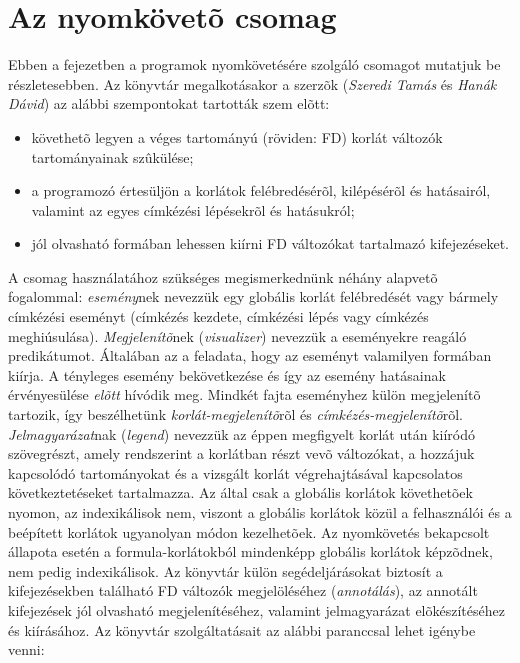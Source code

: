 \clearpage

\section{Az \fdbg nyomkövetõ csomag}

\label{fdbg}
Ebben a fejezetben a \clpfd programok nyomkövetésére szolgáló \fdbg csomagot
mutatjuk be részletesebben. Az \fdbg könyvtár megalkotásakor a szerzõk
(\emph{Szeredi Tamás} és \emph{Hanák Dávid}) az alábbi szempontokat tartották
szem elõtt:

\begin{itemize}
\item követhetõ legyen a véges tartományú (röviden: FD) korlát változók
  tartományainak szûkülése;
\item a programozó értesüljön a korlátok felébredésérõl, kilépésérõl és
  hatásairól, valamint az egyes címkézési lépésekrõl és hatásukról;
\item jól olvasható formában lehessen kiírni FD változókat tartalmazó
  kifejezéseket.
\end{itemize}

A csomag használatához szükséges megismerkednünk néhány alapvetõ fogalommal:
\br
{} {\em esemény}nek nevezzük egy globális korlát felébredését
vagy bármely címkézési eseményt (címkézés kezdete, címkézési lépés vagy címkézés
meghiúsulása).
\br
{} \emph{Megjelenítõ}nek (\emph{visualizer}) nevezzük a \clpfd eseményekre
reagáló predikátumot. Általában az a feladata, hogy az eseményt valamilyen formában
kiírja. A tényleges esemény bekövetkezése és így az esemény hatásainak érvényesülése
\emph{elõtt} hívódik meg. Mindkét fajta \clpfd eseményhez külön megjelenítõ tartozik,
így beszélhetünk \emph{korlát-megjelenítõ}rõl és \emph{címkézés-megjelenítõ}rõl.
\br
{} \emph{Jelmagyarázat}nak (\emph{legend}) nevezzük az éppen megfigyelt korlát
után kiíródó szövegrészt, amely rendszerint a korlátban részt vevõ változókat, a
hozzájuk kapcsolódó tartományokat és a vizsgált korlát végrehajtásával kapcsolatos
következtetéseket tartalmazza.
\br
Az \fdbg által csak a globális korlátok követhetõek nyomon, az indexikálisok nem,
viszont a globális korlátok közül a felhasználói és a beépített korlátok ugyanolyan
módon kezelhetõek. Az \fdbg nyomkövetés bekapcsolt állapota esetén a formula-korlátokból
mindenképp globális korlátok képzõdnek, nem pedig indexikálisok.
\br
Az \fdbg könyvtár külön segédeljárásokat biztosít a kifejezésekben található FD
változók megjelöléséhez (\emph{annotálás}), az annotált kifejezések jól olvasható
megjelenítéséhez, valamint jelmagyarázat elõkészítéséhez és kiírásához.
\br
Az \fdbg könyvtár szolgáltatásait az alábbi paranccsal lehet igénybe venni:

